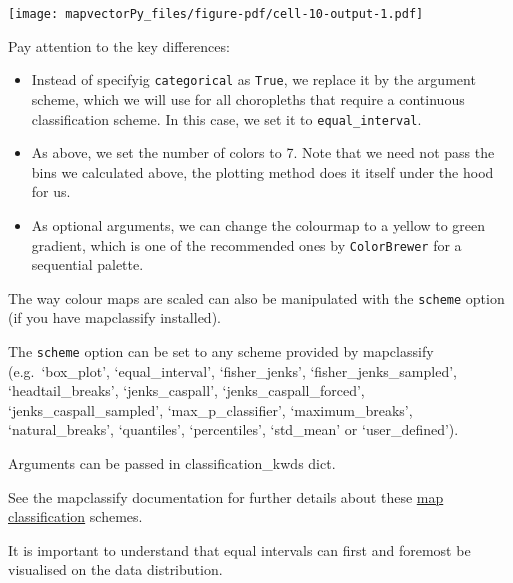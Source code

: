 \documentclass[
  letterpaper,
  DIV=11,
  numbers=noendperiod]{scrreprt}
\begin{document}
\texttt{[image: mapvectorPy\_files/figure-pdf/cell-10-output-1.pdf]}

Pay attention to the key differences:

\begin{itemize}
\item
  Instead of specifyig \texttt{categorical} as \texttt{True}, we replace
  it by the argument scheme, which we will use for all choropleths that
  require a continuous classification scheme. In this case, we set it to
  \texttt{equal\_interval}.
\item
  As above, we set the number of colors to 7. Note that we need not pass
  the bins we calculated above, the plotting method does it itself under
  the hood for us.
\item
  As optional arguments, we can change the colourmap to a yellow to
  green gradient, which is one of the recommended ones by
  \texttt{ColorBrewer} for a sequential palette.
\end{itemize}

\begin{tcolorbox}[enhanced jigsaw, breakable, toptitle=1mm, titlerule=0mm, opacityback=0, colback=white, coltitle=black, leftrule=.75mm, bottomtitle=1mm, colframe=quarto-callout-tip-color-frame, colbacktitle=quarto-callout-tip-color!10!white, toprule=.15mm, bottomrule=.15mm, arc=.35mm, rightrule=.15mm, opacitybacktitle=0.6, title=\textcolor{quarto-callout-tip-color}{\faLightbulb}\hspace{0.5em}{Mapclassify}, left=2mm]

The way colour maps are scaled can also be manipulated with the
\texttt{scheme} option (if you have mapclassify installed).

The \texttt{scheme} option can be set to any scheme provided by
mapclassify (e.g.~`box\_plot', `equal\_interval', `fisher\_jenks',
`fisher\_jenks\_sampled', `headtail\_breaks', `jenks\_caspall',
`jenks\_caspall\_forced', `jenks\_caspall\_sampled',
`max\_p\_classifier', `maximum\_breaks', `natural\_breaks', `quantiles',
`percentiles', `std\_mean' or `user\_defined').

Arguments can be passed in classification\_kwds dict.

See the mapclassify documentation for further details about these
\href{https://pysal.org/mapclassify/}{map classification} schemes.

\end{tcolorbox}

It is important to understand that equal intervals can first and
foremost be visualised on the data distribution.
\end{document}
